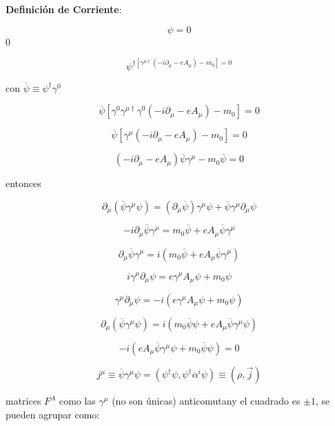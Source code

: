 \documentclass{report}
\begin{document}
\textbf{Definición de Corriente}:

\begin{equation}
[i \gamma^{\mu}(\partial_{\mu} + i e A_{\mu}) - m_{}] \psi = 0
\end{equation}0

\[\psi^{\dagger [\gamma^{\mu \dagger}(- i \partial_{\mu} - e A_{\mu}) - m_{0}] = 0}\]

con $\overline{\psi} \equiv \psi^{\dagger} \gamma^{0}$

\[\overline{\psi}[\gamma^{0} \gamma^{\mu \dagger} \gamma^{0}(-i \partial_{\mu}-eA_{\mu})-m_{0}]=0\]

\[\overline{\psi} [\gamma^{\mu} (-i\partial_{\mu} - eA_{\mu}) - m_{0}]=0\]

\[(-i \partial_{\mu} - eA_{\mu}) \overline{\psi} \gamma^{\mu} - m_{0} \overline{\psi} = 0\]

entonces

\[\partial_{\mu} (\overline{\psi} \gamma^{\mu} \psi) = (\partial_{\mu} \overline{\psi}) \gamma^{\mu} \psi + \overline{\psi} \gamma^{\mu} \partial_{\mu} \psi \]

\[-i \partial_{\mu} \overline{\psi} \gamma^{\mu} = m_{0} \overline{\psi} + e A_{\mu} \overline{\psi} \gamma^{\mu}\]

\begin{equation}
\partial_{\mu} \overline{\psi} \gamma^{\mu} = i (m_{0} \overline{\psi} + e A_{\mu} \overline{\psi} \gamma^{\mu})
\end{equation}

\[i \gamma^{\mu} \partial_{\mu} \psi = e \gamma^{\mu}A_{\mu} \psi + m_{0} \psi\]

\begin{equation}
 \gamma^{\mu} \partial_{\mu} \psi = -i(e \gamma^{\mu} A_{\mu} \psi + m_{0} \psi )
\end{equation}

\[\partial_{\mu} (\overline{\psi} \gamma^{\mu} \psi) = i (m_{0} \overline{\psi} \psi + e A_{\mu} \overline{\psi} \gamma^{\mu} \psi)\]

\[- i (eA_{\mu} \overline{\psi} \gamma^{\mu} \psi + m_{0} \overline{\psi} \psi) = 0\]

\[j^{\mu} \equiv \overline{\psi} \gamma^{\mu} \psi = (\psi^{\dagger} \psi , \psi^{\dagger} \alpha^{i} \psi) \equiv (\rho, \overrightarrow{j})\]

matrices $F^{A}$ como las $\gamma^{\mu}$ (no son únicas) anticomutany el cuadrado es $\pm 1$, se pueden agrupar como:
\end{document}
